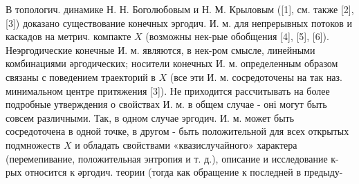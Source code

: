 \documentclass[10pt]{article}
\begin{document}
В топологич. динамике Н. Н. Боголюбовым и Н. М. Крыловым ([1], см. также [2], [3]) доказано существование конечных эргодич. И. м. для непрерывных потоков и каскадов на метрич. компакте $X$ (возможны нек-рые обобщения [4], [5], [6]). Неэргодические конечные И. м. являются, в нек-ром смысле, линейными комбинациями әргодических; носители конечных И. м. определенным образом связаны с поведением траекторий в $X$ (все эти И. м. сосредоточены на так наз. минимальном центре притяжения [3]). Не приходится рассчитывать на более подробные утверждения о свойствах И. м. в общем случае - оні могут быть совсем различными. Так, в одном случае эргодич. И. м. может быть сосредоточена в одной точке, в другом - быть положительной для всех открытых подмножеств $X$ и обладать свойствами «квазислучайного» характера (перемепивание, положительная энтропия и т. д.), описание и исследование к-рых относится к әргодич. теории (тогда как обращение к последней в предыду-
\end{document}
